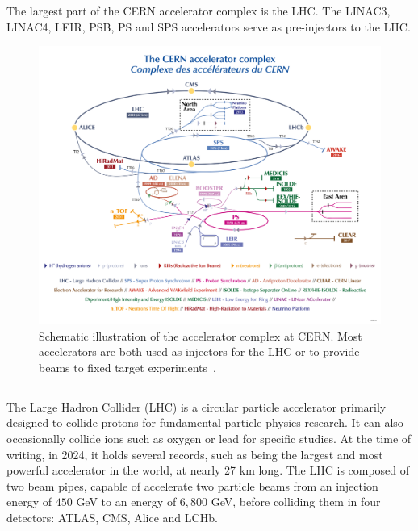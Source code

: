 The largest part of the CERN accelerator complex is the LHC. The LINAC3, LINAC4, LEIR, PSB, PS and
SPS accelerators serve as pre-injectors to the LHC.

\begin{figure}[!htb]
    \centering
    \includegraphics[width=1\textwidth]{images/cern_complex.png}
    \caption{Schematic illustration of the accelerator complex at CERN. Most accelerators are both
    used as injectors for the LHC or to provide beams to fixed target
    experiments~\cite{noauthor_cern_2022}.}
    \label{fig:introduction:cern_complex}
\end{figure}


\subsection{}

The Large Hadron Collider (LHC) is a circular particle accelerator primarily designed to collide
protons for fundamental particle physics research. It can also occasionally collide ions such as
oxygen or lead for specific studies. At the time of writing, in 2024, it holds several records,
such as being the largest and most powerful accelerator in the world, at nearly 27 km long. The LHC
is composed of two beam pipes, capable of accelerate two particle beams from an injection energy
of $450$ GeV to an energy of $6,800$ GeV, before colliding them in four detectors: ATLAS, CMS, Alice
and LCHb.

